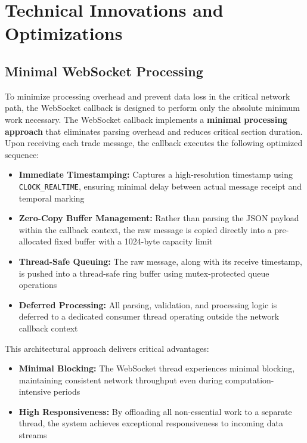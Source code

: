 \documentclass[12pt,a4paper]{article}
\begin{document}
\section{Technical Innovations and Optimizations}

\subsection{Minimal WebSocket Processing}
\label{sec:Minimal WebSocket Processing}

To minimize processing overhead and prevent data loss in the critical network path, the WebSocket callback is designed to perform only the absolute minimum work necessary. The WebSocket callback implements a \textbf{minimal processing approach} that eliminates parsing overhead and reduces critical section duration. Upon receiving each trade message, the callback executes the following optimized sequence:

\begin{itemize}
    \item \textbf{Immediate Timestamping:} Captures a high-resolution timestamp using \texttt{CLOCK\_REALTIME}, ensuring minimal delay between actual message receipt and temporal marking
    
    \item \textbf{Zero-Copy Buffer Management:} Rather than parsing the JSON payload within the callback context, the raw message is copied directly into a pre-allocated fixed buffer with a 1024-byte capacity limit
    
    \item \textbf{Thread-Safe Queuing:} The raw message, along with its receive timestamp, is pushed into a thread-safe ring buffer using mutex-protected queue operations
    
    \item \textbf{Deferred Processing:} All parsing, validation, and processing logic is deferred to a dedicated consumer thread operating outside the network callback context
\end{itemize}

This architectural approach delivers critical advantages:

\begin{itemize}
    \item \textbf{Minimal Blocking:} The WebSocket thread experiences minimal blocking, maintaining consistent network throughput even during computation-intensive periods
    
    \item \textbf{High Responsiveness:} By offloading all non-essential work to a separate thread, the system achieves exceptional responsiveness to incoming data streams        
\end{itemize}
\end{document}
